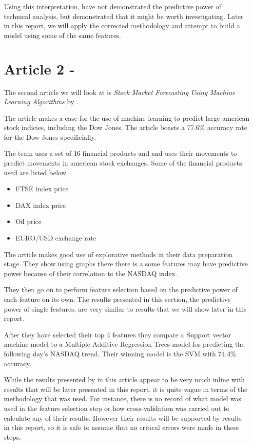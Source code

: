 \documentclass{report}
\begin{document}
Using this interpretation, \citet{kara2011predicting} have not demonstrated the predictive power of technical analysis, but demonstrated that it might be worth investigating. Later in this report, we will apply the corrected methodology and attempt to build a model using some of the same features.

\section{Article 2 - \citet{shen2012stock}}

The second article we will look at is \textit{Stock Market Forecasting Using Machine Learning Algorithms} by \citet{shen2012stock}.

The article makes a case for the use of machine learning to predict large american stock indicies, including the Dow Jones. The article boasts a 77.6\% accuracy rate for the Dow Jones specificially. 

The team uses a set of 16 financial products and and uses their movements to predict movements in american stock exchanges. Some of the financial products used are listed below.

\begin{itemize}[noitemsep]
  \item FTSE index price
  \item DAX index price
  \item Oil price
  \item EURO/USD exchange rate
\end{itemize}

The article makes good use of explorative methods in their data preparation stage. They show using graphs there there is a some features may have predictive power because of their correlation to the NASDAQ index. 

They then go on to perform feature selection based on the predictive power of each feature on its own. The results presented in this section, the predictive power of single features, are very similar to results that we will show later in this report. 

After they have selected their top 4 features they compare a Support vector machine model to a Multiple Additive Regression Trees model for predicting the following day's NASDAQ trend. Their winning model is the SVM with 74.4\% accuracy. 

While the results presented by \citet{shen2012stock} in this article appear to be very much inline with results that will be later presented in this report, it is quite vague in terms of the methodology that was used. For instance, there is no record of what model was used in the feature selection step or how cross-validation was carried out to calculate any of their results. However their results will be supported by results in this report, so it is safe to assume that no critical errors were made in these steps.
\end{document}
